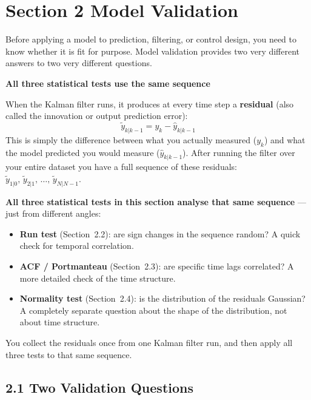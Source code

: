 \documentclass[12pt, a4paper]{article}
\begin{document}
\clearpage
\section*{Section 2 \quad Model Validation}

Before applying a model to prediction, filtering, or control design, you
need to know whether it is fit for purpose.
Model validation provides two very different answers to two very different
questions.

\begin{notebox}
  \textbf{All three statistical tests use the same sequence}

  When the Kalman filter runs, it produces at every time step a
  \textbf{residual} (also called the innovation or output prediction
  error):
  \[
    \tilde{y}_{k|k-1} = y_k - \hat{y}_{k|k-1}
  \]
  This is simply the difference between what you actually measured
  ($y_k$) and what the model predicted you would measure
  ($\hat{y}_{k|k-1}$).
  After running the filter over your entire dataset you have a full
  sequence of these residuals: $\tilde{y}_{1|0},\, \tilde{y}_{2|1},\,
  \ldots,\, \tilde{y}_{N|N-1}$.

  \textbf{All three statistical tests in this section analyse that same
  sequence} --- just from different angles:
  \begin{itemize}[leftmargin=1.5em, itemsep=2pt]
    \item \textbf{Run test} (Section~2.2): are sign changes in the
      sequence random?
      A quick check for temporal correlation.
    \item \textbf{ACF / Portmanteau} (Section~2.3): are specific time
      lags correlated?
      A more detailed check of the time structure.
    \item \textbf{Normality test} (Section~2.4): is the distribution of
      the residuals Gaussian?
      A completely separate question about the shape of the distribution,
      not about time structure.
  \end{itemize}
  You collect the residuals once from one Kalman filter run, and then
  apply all three tests to that same sequence.
\end{notebox}

\subsection*{2.1 \quad Two Validation Questions}
\end{document}
